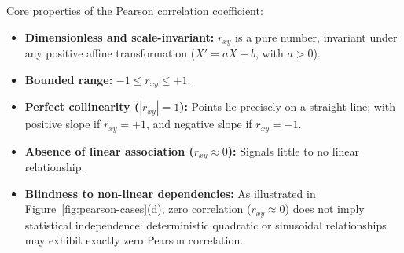 Core properties of the Pearson correlation coefficient:
\begin{itemize}
    \item \textbf{Dimensionless and scale-invariant:} $r_{xy}$ is a pure number, invariant under any positive affine transformation ($X' = aX + b$, with $a > 0$).
    \item \textbf{Bounded range:} $-1 \le r_{xy} \le +1$.
    \item \textbf{Perfect collinearity ($|r_{xy}| = 1$):} Points lie precisely on a straight line; with positive slope if $r_{xy} = +1$, and negative slope if $r_{xy} = -1$.
    \item \textbf{Absence of linear association ($r_{xy} \approx 0$):} Signals little to no linear relationship.
    \item \textbf{Blindness to non-linear dependencies:} As illustrated in Figure~\ref{fig:pearson-cases}(d), zero correlation ($r_{xy} \approx 0$) does not imply statistical independence: deterministic quadratic or sinusoidal relationships may exhibit exactly zero Pearson correlation.
\end{itemize}

